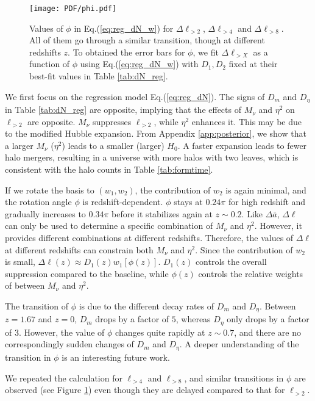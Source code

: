 \begin{figure}[!h]
		\begin{center}%
		\texttt{[image: PDF/phi.pdf]}
		\caption{\label{fig:phi} Values of $\phi$ in Eq.(\ref{eq:reg_dN_w}) for $\Delta \ell_{>2}$,  $\Delta \ell_{>4}$ and $\Delta \ell_{>8}$. All of them go through a similar transition, though at different redshifts $z$. 
		To obtained the error bars for $\phi$, we fit $\Delta \ell_{>X}$ as a function of $\phi$ using Eq.(\ref{eq:reg_dN_w}) with $D_1, D_2$ fixed at their best-fit values in Table \ref{tab:dN_reg}.}
		\end{center}
\end{figure}

We first focus on the regression model Eq.(\ref{eq:reg_dN}). The signs of $D_m$ and $D_\eta$ in Table \ref{tab:dN_reg} are opposite, implying that the effects of $M_\nu$ and $\eta^2$ on $\ell_{>2}$ are opposite. 
$M_\nu$ suppresses $\ell_{>2}$, while $\eta^2$ enhances it. 
This may be due to the modified Hubble expansion. From Appendix \ref{app:posterior}, we show that a larger $M_\nu$ ($\eta^2$) leads to a smaller (larger) $H_0$.
A faster expansion leads to fewer halo mergers, resulting in a universe with more halos with two leaves, which is consistent with the halo counts in Table \ref{tab:formtime}.

If we rotate the basis to $(w_1, w_2)$, the contribution of $w_2$ is again minimal, and the rotation angle $\phi$ is redshift-dependent. $\phi$ stays at $0.24\pi$ for high redshift and gradually increases to $0.34\pi$ before it stabilizes again at $z\sim0.2$. 
Like $\Delta \bar a$, $\Delta \ell$ can only be used to determine a specific combination of $M_\nu$ and $\eta^2$. However, it provides different combinations at different redshifts. Therefore, the values of $\Delta \ell$ at different redshifts can constrain both $M_\nu$ and $\eta^2$.
Since the contribution of $w_2$ is small, $\Delta \ell(z)\approx D_1(z) w_1[\phi(z)]$. $D_1(z)$ controls the overall suppression compared to the baseline, while $\phi(z)$ controls the relative weights of between $M_\nu$ and $\eta^2$.

The transition of $\phi$ is due to the different decay rates of $D_m$ and $D_\eta$. 
Between $z=1.67$ and $z=0$, $D_m$ drops by a factor of $5$, whereas $D_\eta$ only drops by a factor of $3$. 
However, the value of $\phi$ changes quite rapidly at $z\sim0.7$, and there are no correspondingly sudden changes of $D_m$ and $D_\eta$. A deeper understanding of the transition in $\phi$ is an interesting future work. 

We repeated the calculation for $\ell_{>4}$ and $\ell_{>8}$, and similar transitions in $\phi$ are observed (see Figure \ref{fig:phi}) even though they are delayed compared to that for $\ell_{>2}$.

